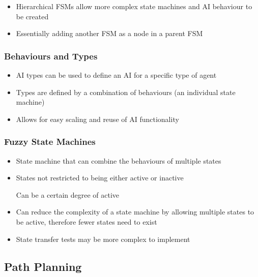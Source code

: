 \documentclass[a4paper]{article}
\begin{document}
\begin{itemize}
  \item
    Hierarchical FSMs allow more complex state machines and AI behaviour to be
    created

  \item
    Essentially adding another FSM as a node in a parent FSM

\end{itemize}

\subsubsection{Behaviours and Types}

\begin{itemize}
  \item
    AI types can be used to define an AI for a specific type of agent

  \item
    Types are defined by a combination of behaviours (an individual state
    machine)

  \item
    Allows for easy scaling and reuse of AI functionality

\end{itemize}

\subsubsection{Fuzzy State Machines}

\begin{itemize}
  \item
    State machine that can combine the behaviours of multiple states

  \item
    States not restricted to being either active or inactive

    Can be a certain degree of active

  \item
    Can reduce the complexity of a state machine by allowing multiple states to
    be active, therefore fewer states need to exist

  \item
    State transfer tests may be more complex to implement

\end{itemize}

\subsection{Path Planning}
\end{document}
